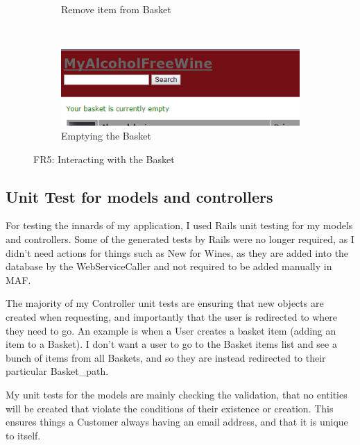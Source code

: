 \documentclass[12pt]{article}
\begin{document}
\begin{figure}[H]
\begin{subfigure}[b]{0.3\textwidth}
        \caption{Remove item from Basket}
        \label{fig:FR5 Remove item from Basket}
    \end{subfigure}
    ~ %
    \begin{subfigure}[b]{0.3\textwidth}
        \includegraphics[width=\textwidth]{assets/FR5_screen_3}
        \caption{Emptying the Basket}
        \label{fig:FR5 empty basket}
    \end{subfigure}
    \caption{FR5: Interacting with the Basket}\label{fig:FR5 Basket}
\end{figure}



\subsection{Unit Test for models and controllers}
For testing the innards of my application, I used Rails unit testing for my models and controllers. Some of the generated tests by Rails were no longer required, as I didn't need actions for things such as New for Wines, as they are added into the database by the WebServiceCaller and not required to be added manually in MAF.

The majority of my Controller unit tests are ensuring that new objects are created when requesting, and importantly that the user is redirected to where they need to go. An example is when a User creates a basket item (adding an item to a Basket). I don't want a user to go to the Basket items list and see a bunch of items from all Baskets, and so they are instead redirected to their particular Basket\_path.

My unit tests for the models are mainly checking the validation, that no entities will be created that violate the conditions of their existence or creation. This ensures things a Customer always having an email address, and that it is unique to itself. 
\end{document}
